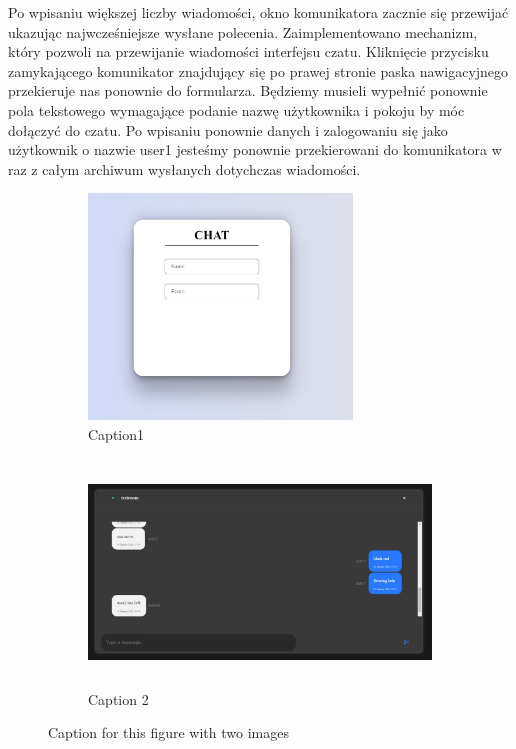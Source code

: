 Po wpisaniu większej liczby wiadomości, okno komunikatora zacznie się przewijać ukazując najwcześniejsze wysłane polecenia. Zaimplementowano mechanizm, który pozwoli na przewijanie wiadomości interfejsu czatu.
\newpage
Kliknięcie przycisku zamykającego komunikator znajdujący się po prawej stronie paska nawigacyjnego przekieruje nas ponownie do formularza.  Będziemy musieli wypełnić ponownie pola tekstowego wymagające podanie nazwę użytkownika i pokoju by móc dołączyć do czatu. Po wpisaniu ponownie danych i zalogowaniu się jako użytkownik o nazwie user1 jesteśmy ponownie przekierowani do komunikatora w raz z całym archiwum wysłanych dotychczas wiadomości.
\begin{figure}[h]
\begin{subfigure}{0.5\textwidth}
\includegraphics[width=0.9\linewidth, height=6cm]{"obrazy/TESTLOGOWANIE"} 
\caption{Caption1}
\label{fig:subim1}
\end{subfigure}
\begin{subfigure}{0.5\textwidth}
\includegraphics[width=0.9\linewidth, height=6cm]{"obrazy/TESTostatniscreen"}
\caption{Caption 2}
\label{fig:subim2}
\end{subfigure}

\caption{Caption for this figure with two images}
\label{fig:image2}
\end{figure}



